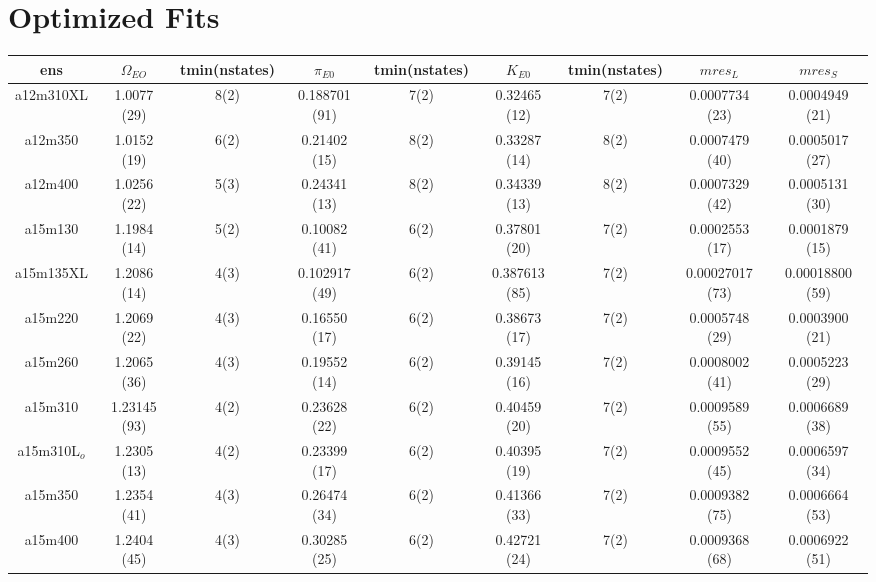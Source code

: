 \documentclass{article}
\begin{document}
 \section*{Optimized Fits}
 \begin{table}[h!]
  \centering
 \setlength{\arrayrulewidth}{0.5mm}
\setlength{\tabcolsep}{13pt}
\renewcommand{\arraystretch}{2}
 \begin{tabular}{|| c |c | c | c | c | c | c | c | c ||} 
 \hline
 ens &  $\Omega_{EO}$ & tmin(nstates) & $\pi_{E0}$  & tmin(nstates)& $K_{E0}$  & tmin(nstates) & $mres_{L}$ & $mres_{S}$\\ [0.8ex] 
 \hline\hline
 a12m310XL 
 & {1.0077 (29)}   &   {8(2)} & {0.188701 (91)}   & {7(2)}   & {0.32465 (12)}  & {7(2)}   & {0.0007734 (23)}  & {0.0004949 (21)} \\ 
 \hline
 a12m350 
 & {1.0152 (19)}   &   {6(2)} & {0.21402 (15)}   & {8(2)}   & {0.33287 (14)}  & {8(2)}   & {0.0007479 (40)}  & {0.0005017 (27)}  \\
 \hline
 a12m400 
  & {1.0256 (22)}   &   {5(3)} & {0.24341 (13)}   & {8(2)}   & {0.34339 (13)}  & {8(2)}   & {0.0007329 (42)}  & {0.0005131 (30)}  \\
 \hline
 a15m130
  & {1.1984 (14)}   &   {5(2)} & {0.10082 (41)}   & {6(2)}   & {0.37801 (20)}  & {7(2)}   & {0.0002553 (17)}  & {0.0001879 (15)}   \\
 \hline
 a15m135XL 
 & {1.2086 (14)}   &   {4(3)} & {0.102917 (49)}   & {6(2)}   & {0.387613 (85)}  & {7(2)}   & {0.00027017 (73)}  & {0.00018800 (59)} \\
 \hline
 a15m220
  & {1.2069 (22)}   &   {4(3)} & {0.16550 (17)}   & {6(2)}   & {0.38673 (17)}  & {7(2)}   & {0.0005748 (29)}  & {0.0003900 (21)} \\
 \hline
 a15m260
  & {1.2065 (36)}   &   {4(3)} & {0.19552 (14)}   & {6(2)}   & {0.39145 (16)}  & {7(2)}   & {0.0008002 (41)}  & {0.0005223 (29)} \\
 \hline
 a15m310 
  & {1.23145 (93)}   &   {4(2)} & {0.23628 (22)}  & {6(2)}   & {0.40459 (20)}  & {7(2)}   & {0.0009589 (55)}  & {0.0006689 (38)} \\
 \hline
 a15m310L$_o$ 
  & {1.2305 (13)}   &   {4(2)} & {0.23399 (17)}   & {6(2)}   & {0.40395 (19)}   & {7(2)}  & {0.0009552 (45)}  & {0.0006597 (34)}\\
 \hline
 a15m350 
  & {1.2354 (41)}   &   {4(3)} & {0.26474 (34)}   & {6(2)}   & {0.41366 (33)}  & {7(2)}  & {0.0009382 (75)}  & {0.0006664 (53)} \\
 \hline
  a15m400 
  & {1.2404 (45)}   &   {4(3)} & {0.30285 (25)}   & {6(2)}   & {0.42721 (24)}  & {7(2)}  & {0.0009368 (68)}  & {0.0006922 (51)} \\
  \hline
 
 \end{tabular}
\end{table}
\clearpage
\end{document}
